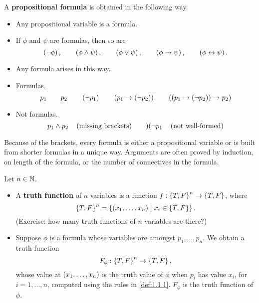 \begin{definition}
\label{def:1.1.2}
A \textbf{propositional formula} is obtained in the following way.
\begin{itemize}
\item Any propositional variable is a formula.
\item If $ \phi $ and $ \psi $ are formulas, then so are
$$ \left( \neg \phi \right), \qquad \left( \phi \land \psi \right), \qquad \left( \phi \lor \psi \right), \qquad \left( \phi \rightarrow \psi \right), \qquad \left( \phi \leftrightarrow \psi \right). $$
\item Any formula arises in this way.
\end{itemize}
\end{definition}

\pagebreak

\begin{example*}
\hfill
\begin{itemize}
\item Formulas.
$$ p_1 \qquad p_2 \qquad \left( \neg p_1 \right) \qquad \left( p_1 \rightarrow \left( \neg p_2 \right) \right) \qquad \left( \left( p_1 \rightarrow \left( \neg p_2 \right) \right) \rightarrow p_2 \right) $$
\item Not formulas.
$$ p_1 \land p_2 \quad \left( \text{missing brackets} \right) \qquad )( \neg p_1 \quad \left( \text{not well-formed} \right) $$
\end{itemize}
\end{example*}

Because of the brackets, every formula is either a propositional variable or is built from shorter formulas in a unique way. Arguments are often proved by induction, on length of the formula, or the number of connectives in the formula.

\begin{definition}
Let $ n \in \mathbb{N} $.
\begin{itemize}
\item A \textbf{truth function} of $ n $ variables is a function $ f : \left\{ T, F \right\}^n \to \left\{ T, F \right\} $, where
$$ \left\{ T, F \right\}^n = \left\{ \left( x_1, \dots, x_n \right) \mid x_i \in \left\{ T, F \right\} \right\}. $$
(Exercise: how many truth functions of $ n $ variables are there?)
\item Suppose $ \phi $ is a formula whose variables are amongst $ p_1, \dots, p_n $. We obtain a truth function
$$ F_\phi : \left\{ T, F \right\}^n \to \left\{ T, F \right\}, $$
whose value at $ \left( x_1, \dots, x_n \right) $ is the truth value of $ \phi $ when $ p_i $ has value $ x_i $, for $ i = 1, \dots, n $, computed using the rules in \ref{def:1.1.1}. $ F_\phi $ is the truth function of $ \phi $.
\end{itemize}
\end{definition}

